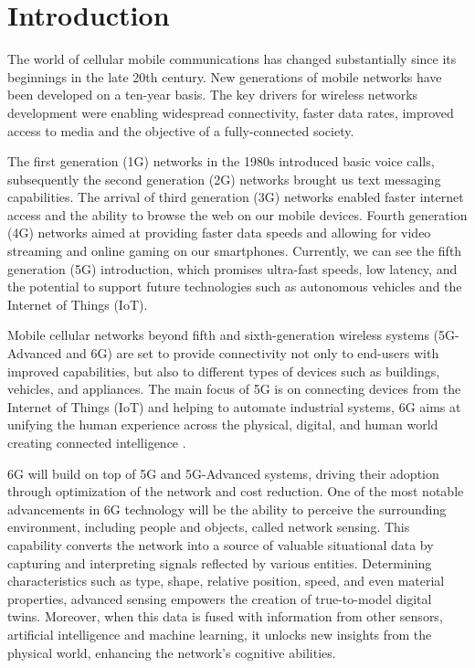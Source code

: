 \chapter{Introduction}
\label{chap_intro}

The world of cellular mobile communications has changed substantially since its beginnings in the late 20th century.
New generations of mobile networks have been developed on a ten-year basis. The key drivers for wireless networks development were enabling widespread connectivity, faster data rates, improved access to media and the objective of a fully-connected society.

The first generation (1G) networks in the 1980s introduced basic voice calls, subsequently the second generation (2G) networks brought us text messaging capabilities. The arrival of third generation (3G) networks enabled faster internet access and the ability to browse the web on our mobile devices. 
Fourth generation (4G) networks aimed at providing faster data speeds and allowing for video streaming and online gaming on our smartphones. 
Currently, we can see the fifth generation (5G) introduction, which promises ultra-fast speeds, low latency, and the potential to support future technologies such as autonomous vehicles and the Internet of Things (IoT). 

Mobile cellular networks beyond fifth and sixth-generation wireless systems (5G-Advanced and 6G) are set to provide connectivity not only to end-users with improved capabilities, but also to different types of devices such as buildings, vehicles, and appliances.
The main focus of 5G is on connecting devices from the Internet of Things (IoT) and helping to automate industrial systems, 6G aims at unifying the human experience across the physical, digital, and human world creating connected intelligence \cite{6G-explained-NOKIA}.


6G will build on top of 5G and 5G-Advanced systems, driving their adoption through optimization of the network and cost reduction. 
One of the most notable advancements in 6G technology will be the ability to perceive the surrounding environment, including people and objects, called network sensing. This capability converts the network into a source of valuable situational data by capturing and interpreting signals reflected by various entities. 
Determining characteristics such as type, shape, relative position, speed, and even material properties, advanced sensing empowers the creation of true-to-model digital twins.
Moreover, when this data is fused with information from other sensors, artificial intelligence and machine learning, it unlocks new insights from the physical world, enhancing the network's cognitive abilities.


